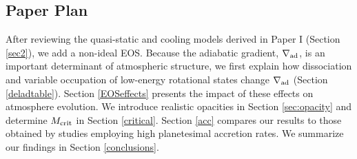 \subsection{Paper Plan}

After reviewing the quasi-static and cooling models derived in Paper I (Section \ref{sec2}), we add a non-ideal EOS.  Because the  adiabatic gradient, $\nabla_{\rm ad}$, is an important determinant of atmospheric structure, we first explain how dissociation and variable occupation of low-energy rotational states change $\nabla_{\rm ad}$ (Section \ref{deladtable}).  Section \ref{EOSeffects} presents the impact of these effects on atmosphere evolution.  We introduce realistic opacities in Section \ref{sec:opacity} and determine $M_{\rm crit}$ in Section \ref{critical}. Section \ref{acc}  compares our results to those obtained by studies employing high planetesimal accretion rates. We summarize our findings in Section \ref{conclusions}.






